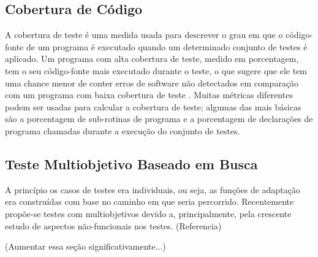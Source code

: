 \subsection{Cobertura de Código}

A cobertura de teste é uma medida usada para descrever o grau em que o código-fonte de um programa é executado quando um determinado conjunto de testes é aplicado. Um programa com alta cobertura de teste, medido em porcentagem, tem o seu código-fonte mais executado durante o teste, o que sugere que ele tem uma chance menor de conter erros de software não detectados em comparação com um programa com baixa cobertura de teste \cite{yang2009survey}. Muitas métricas diferentes podem ser usadas para calcular a cobertura de teste; algumas das mais básicas são a porcentagem de sub-rotinas de programa e a porcentagem de declarações de programa chamadas durante a execução do conjunto de testes.

\subsection{Teste Multiobjetivo Baseado em Busca}

A princípio os casos de testes era individuais, ou seja, as funções de
adaptação era construídas com base no caminho em que seria percorrido.
Recentemente propõe-se testes com multiobjetivos devido a, principalmente, pela
crescente estudo de aspectos não-funcionais nos testes. (Referencia)

(Aumentar essa seção significativamente...)












